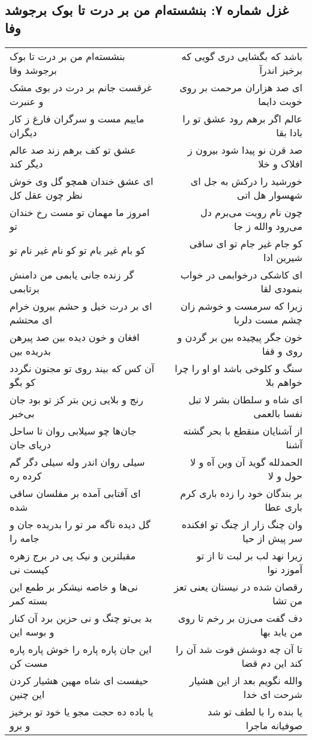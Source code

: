 \begin{center}
\section*{غزل شماره ۷: بنشسته‌ام من بر درت تا بوک برجوشد وفا}
\label{sec:0007}
\begin{longtable}{l p{0.5cm} r}
بنشسته‌ام من بر درت تا بوک برجوشد وفا
&&
باشد که بگشایی دری گویی که برخیز اندرآ
\\
غرقست جانم بر درت در بوی مشک و عنبرت
&&
ای صد هزاران مرحمت بر روی خوبت دایما
\\
ماییم مست و سرگران فارغ ز کار دیگران
&&
عالم اگر برهم رود عشق تو را بادا بقا
\\
عشق تو کف برهم زند صد عالم دیگر کند
&&
صد قرن نو پیدا شود بیرون ز افلاک و خلا
\\
ای عشق خندان همچو گل وی خوش نظر چون عقل کل
&&
خورشید را درکش به جل ای شهسوار هل اتی
\\
امروز ما مهمان تو مست رخ خندان تو
&&
چون نام رویت می‌برم دل می‌رود والله ز جا
\\
کو بام غیر بام تو کو نام غیر نام تو
&&
کو جام غیر جام تو ای ساقی شیرین ادا
\\
گر زنده جانی یابمی من دامنش برتابمی
&&
ای کاشکی درخوابمی در خواب بنمودی لقا
\\
ای بر درت خیل و حشم بیرون خرام ای محتشم
&&
زیرا که سرمست و خوشم زان چشم مست دلربا
\\
افغان و خون دیده بین صد پیرهن بدریده بین
&&
خون جگر پیچیده بین بر گردن و روی و قفا
\\
آن کس که بیند روی تو مجنون نگردد کو بگو
&&
سنگ و کلوخی باشد او او را چرا خواهم بلا
\\
رنج و بلایی زین بتر کز تو بود جان بی‌خبر
&&
ای شاه و سلطان بشر لا تبل نفسا بالعمی
\\
جان‌ها چو سیلابی روان تا ساحل دریای جان
&&
از آشنایان منقطع با بحر گشته آشنا
\\
سیلی روان اندر وله سیلی دگر گم کرده ره
&&
الحمدلله گوید آن وین آه و لا حول و لا
\\
ای آفتابی آمده بر مفلسان ساقی شده
&&
بر بندگان خود را زده باری کرم باری عطا
\\
گل دیده ناگه مر تو را بدریده جان و جامه را
&&
وان چنگ زار از چنگ تو افکنده سر پیش از حیا
\\
مقبلترین و نیک پی در برج زهره کیست نی
&&
زیرا نهد لب بر لبت تا از تو آموزد نوا
\\
نی‌ها و خاصه نیشکر بر طمع این بسته کمر
&&
رقصان شده در نیستان یعنی تعز من تشا
\\
بد بی‌تو چنگ و نی حزین برد آن کنار و بوسه این
&&
دف گفت می‌زن بر رخم تا روی من یابد بها
\\
این جان پاره پاره را خوش پاره پاره مست کن
&&
تا آن چه دوشش فوت شد آن را کند این دم قضا
\\
حیفست ای شاه مهین هشیار کردن این چنین
&&
والله نگویم بعد از این هشیار شرحت ای خدا
\\
یا باده ده حجت مجو یا خود تو برخیز و برو
&&
یا بنده را با لطف تو شد صوفیانه ماجرا
\\
\end{longtable}
\end{center}
